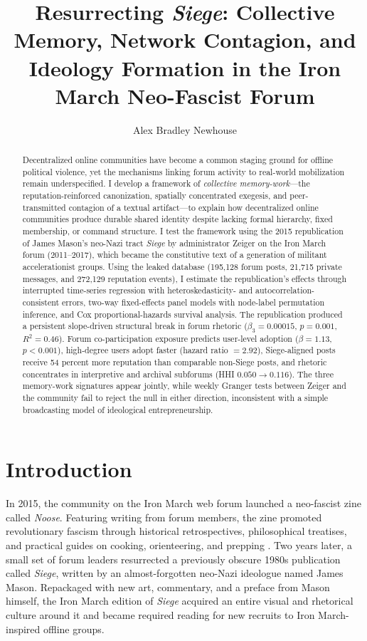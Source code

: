 \documentclass[bibtex,autowc,nonblind]{apsr_submission}
\title{Resurrecting \textit{Siege}: Collective Memory, Network Contagion, and Ideology Formation in the Iron March Neo-Fascist Forum}
\author{Alex Bradley Newhouse}
       {University of Colorado Boulder}
       {alex.newhouse@colorado.edu}
\begin{document}
\begin{frontmatter}
\begin{abstract}
Decentralized online communities have become a common staging ground for offline political violence, yet the mechanisms linking forum activity to real-world mobilization remain underspecified. I develop a framework of \textit{collective memory-work}---the reputation-reinforced canonization, spatially concentrated exegesis, and peer-transmitted contagion of a textual artifact---to explain how decentralized online communities produce durable shared identity despite lacking formal hierarchy, fixed membership, or command structure. I test the framework using the 2015 republication of James Mason's neo-Nazi tract \textit{Siege} by administrator Zeiger on the Iron March forum (2011--2017), which became the constitutive text of a generation of militant accelerationist groups. Using the leaked database (195,128 forum posts, 21,715 private messages, and 272,129 reputation events), I estimate the republication's effects through interrupted time-series regression with heteroskedasticity- and autocorrelation-consistent errors, two-way fixed-effects panel models with node-label permutation inference, and Cox proportional-hazards survival analysis. The republication produced a persistent slope-driven structural break in forum rhetoric ($\beta_3=0.00015$, $p=0.001$, $R^2=0.46$). Forum co-participation exposure predicts user-level adoption ($\beta=1.13$, $p<0.001$), high-degree users adopt faster (hazard ratio $=2.92$), Siege-aligned posts receive 54 percent more reputation than comparable non-Siege posts, and rhetoric concentrates in interpretive and archival subforums (HHI $0.050 \to 0.116$). The three memory-work signatures appear jointly, while weekly Granger tests between Zeiger and the community fail to reject the null in either direction, inconsistent with a simple broadcasting model of ideological entrepreneurship.
\end{abstract}
\end{frontmatter}

\section{Introduction}

In 2015, the community on the Iron March web forum launched a neo-fascist zine called \textit{Noose}. Featuring writing from forum members, the zine promoted revolutionary fascism through historical retrospectives, philosophical treatises, and practical guides on cooking, orienteering, and prepping \citep{sunshine2024neo, upchurch}. Two years later, a small set of forum leaders resurrected a previously obscure 1980s publication called \textit{Siege}, written by an almost-forgotten neo-Nazi ideologue named James Mason. Repackaged with new art, commentary, and a preface from Mason himself, the Iron March edition of \textit{Siege} acquired an entire visual and rhetorical culture around it and became required reading for new recruits to Iron March-inspired offline groups.
\end{document}

